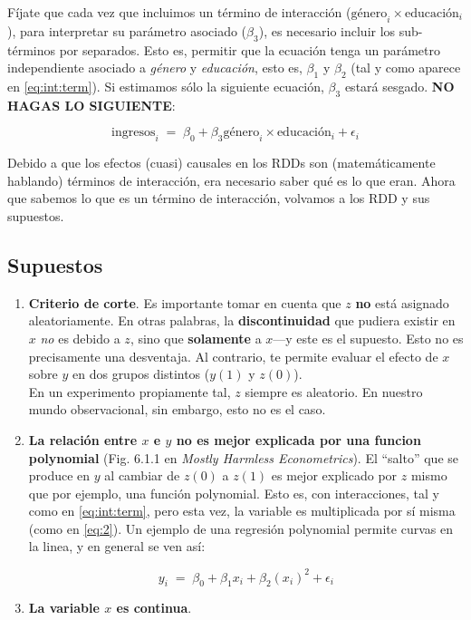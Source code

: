 \documentclass[10pt]{article}
\begin{document}
F\'ijate que cada vez que incluimos un t\'ermino de interacci\'on (${\text{g\'enero}}_{i}\times \text{educaci\'on}_{i}$), para interpretar su par\'ametro asociado ($\beta_{3}$), es necesario incluir los sub-t\'erminos por separados. Esto es, permitir que la ecuaci\'on tenga un par\'ametro independiente asociado a \emph{g\'enero} y \emph{educaci\'on}, esto es, $\beta_{1}$ y $\beta_{2}$ (tal y como aparece en \autoref{eq:int:term}). Si estimamos s\'olo la siguiente ecuaci\'on, $\beta_{3}$ estar\'a sesgado. {\bf NO HAGAS LO SIGUIENTE}:


		\begin{equation}\label{eq:int:term:mala}
			\text{ingresos}_{i} \;=\; \beta_{0} + \beta_{3}{\text{g\'enero}}_{i}\times \text{educaci\'on}_{i} + \epsilon_{i}
		\end{equation}

Debido a que los efectos (cuasi) causales en los RDDs son (matem\'aticamente hablando) t\'erminos de interacci\'on, era necesario saber qu\'e es lo que eran. Ahora que sabemos lo que es un t\'ermino de interacci\'on, volvamos a los RDD y sus supuestos.

\subsection*{Supuestos}

\begin{enumerate}
	\item {\bf Criterio de corte}. Es importante tomar en cuenta que $z$ {\bf no} est\'a asignado aleatoriamente. En otras palabras, la {\bf discontinuidad} que pudiera existir en $x$ \emph{no} es debido a $z$, sino que {\bf solamente} a $x$---y este es el supuesto. Esto no es precisamente una desventaja. Al contrario, te permite evaluar el efecto de $x$ sobre $y$ en dos grupos distintos ($y(1)$ y $z(0)$). 
	\\
	En un experimento propiamente tal, $z$ siempre es aleatorio. En nuestro mundo observacional, sin embargo, esto no es el caso.

	\item {\bf La relaci\'on entre $x$ e $y$ no es mejor explicada por una funcion polynomial} (Fig. 6.1.1 en \emph{Mostly Harmless Econometrics}). El ``salto'' que se produce en $y$ al cambiar de $z(0)$ a $z(1)$ es mejor explicado por $z$ mismo que por ejemplo, una funci\'on polynomial. Esto es, con interacciones, tal y como en \autoref{eq:int:term}, pero esta vez, la variable es multiplicada por s\'i misma (como en \autoref{eq:2}). Un ejemplo de una regresi\'on polynomial permite curvas en la linea, y en general se ven as\'i:

		\begin{equation}\label{eq:2}
			y_{i} \;=\; \beta_{0} + \beta_{1}x_{i} + \beta_{2}(x_{i})^2 + \epsilon_{i}
		\end{equation}

	\item {\bf La variable $x$ es continua}. 
\end{enumerate}
\end{document}
